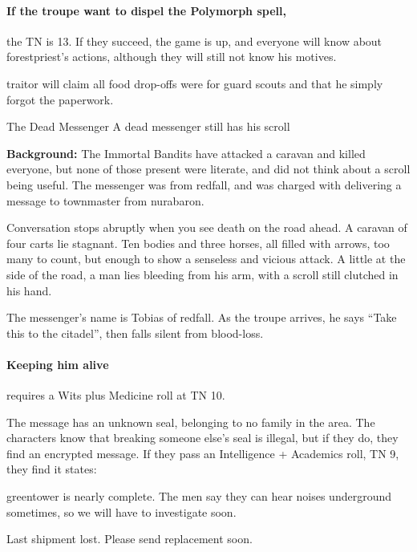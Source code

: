 \paragraph{If the troupe want to dispel the Polymorph spell,}
the TN is 13.
If they succeed, the game is up, and everyone will know about \gls{forestpriest}'s actions, although they will still not know his motives.

\Gls{traitor} will claim all food drop-offs were for \gls{guard} scouts and that he simply forgot the paperwork.

{The Dead Messenger}%
{A dead messenger still has his scroll}%

\textbf{Background:}
The Immortal Bandits have attacked a caravan and killed everyone, but none of those present were literate, and did not think about a scroll being useful.
The messenger was from \gls{redfall}, and was charged with delivering a message to \gls{townmaster} from \gls{nurabaron}.

\begin{boxtext}

  Conversation stops abruptly when you see death on the road ahead.
  A caravan of four carts lie stagnant.
  Ten bodies and three horses, all filled with arrows, too many to count, but enough to show a senseless and vicious attack.
  A little at the side of the road, a man lies bleeding from his arm, with a scroll still clutched in his hand.

\end{boxtext}

The messenger's name is Tobias of \gls{redfall}.
As the troupe arrives, he says ``Take this to the citadel'', then falls silent from blood-loss.

\paragraph{Keeping him alive}
requires a Wits plus Medicine roll at TN 10.

The message has an unknown seal, belonging to no family in the area.
The characters know that breaking someone else's seal is illegal, but if they do, they find an encrypted message.
If they pass an Intelligence + Academics roll, TN 9, they find it states:

\begin{speechtext}

  \Gls{greentower} is nearly complete.
  The men say they can hear noises underground sometimes, so we will have to investigate soon.

  Last shipment lost.
  Please send replacement soon.

\end{speechtext}

